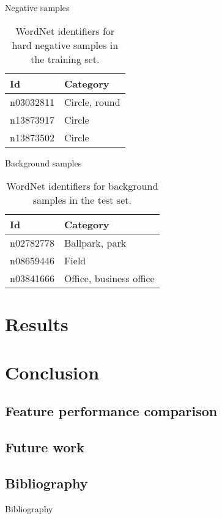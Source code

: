 \documentclass{beamer}
\begin{document}
\begin{frame}{Negative samples}
	\begin{table}[H]
		\centering
		\caption{WordNet identifiers for hard negative samples in the training set.}
		\label{tab:negtraining}
		\begin{tabularx}{\textwidth}{lX}
			\toprule
			\textbf{Id} & \textbf{Category} \\
			\midrule
				n03032811 & Circle, round \\
				n13873917 & Circle \\
				n13873502 & Circle \\
			\bottomrule
		\end{tabularx}
	\end{table}
\end{frame}

\begin{frame}{Background samples}
	\begin{table}[H]
		\centering
		\caption{WordNet identifiers for background samples in the test set.}
		\label{tab:baktraining}
		\begin{tabularx}{\textwidth}{lX}
			\toprule
			\textbf{Id} & \textbf{Category} \\
			\midrule
				n02782778 & Ballpark, park \\
				n08659446 & Field \\
				n03841666 & Office, business office \\
			\bottomrule
		\end{tabularx}
	\end{table}
\end{frame}


\section{Results}


\section{Conclusion}

	\subsection{Feature performance comparison}

	\subsection{Future work}

	\subsection{Bibliography}

	\begin{frame}{Bibliography}
		
		
	\end{frame}
\end{document}
